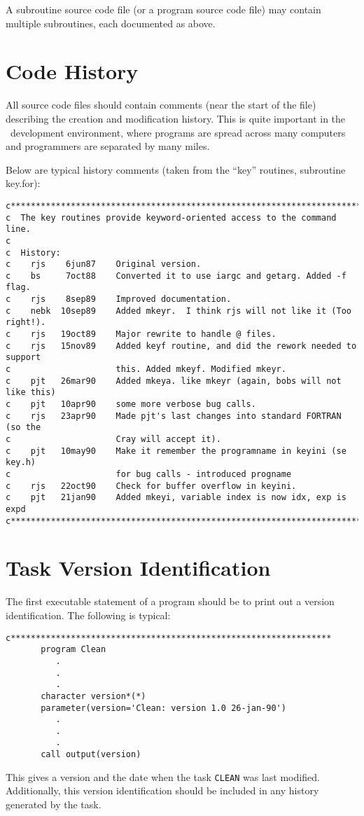 \documentclass{report}
\begin{document}
A subroutine source code file (or a program source code file) may contain
multiple subroutines, each documented as above.

\section{Code History}
All source code files should contain comments (near the start of the file)
describing the creation and modification history.  This is quite important
in the \miriad\ development environment, where programs are spread
across many computers and programmers are separated by many miles.

Below are typical history comments (taken from the ``key'' routines,
subroutine key.for):
{\small\begin{verbatim}
c************************************************************************
c  The key routines provide keyword-oriented access to the command line.
c
c  History:
c    rjs    6jun87    Original version.
c    bs     7oct88    Converted it to use iargc and getarg. Added -f flag.
c    rjs    8sep89    Improved documentation.
c    nebk  10sep89    Added mkeyr.  I think rjs will not like it (Too right!).
c    rjs   19oct89    Major rewrite to handle @ files.
c    rjs   15nov89    Added keyf routine, and did the rework needed to support
c                     this. Added mkeyf. Modified mkeyr.
c    pjt   26mar90    Added mkeya. like mkeyr (again, bobs will not like this)
c    pjt   10apr90    some more verbose bug calls.
c    rjs   23apr90    Made pjt's last changes into standard FORTRAN (so the
c                     Cray will accept it).
c    pjt   10may90    Make it remember the programname in keyini (se key.h)
c                     for bug calls - introduced progname
c    rjs   22oct90    Check for buffer overflow in keyini.
c    pjt   21jan90    Added mkeyi, variable index is now idx, exp is expd
c************************************************************************
\end{verbatim}}

\section{Task Version Identification}
The first executable statement of a program should be to print out a version
identification. The following is typical:
\begin{verbatim}
c****************************************************************
       program Clean
          .
          .
          .
       character version*(*)
       parameter(version='Clean: version 1.0 26-jan-90')
          .
          .
          .
       call output(version)
\end{verbatim}
This gives a version and the date when the task {\tt CLEAN} was last modified.
Additionally, this version identification should be included
in any history generated by the task.
\end{document}

